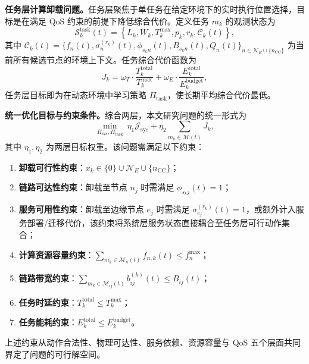 \textbf{任务层计算卸载问题。}任务层聚焦于单任务在给定环境下的实时执行位置选择，目标是在满足 QoS 约束的前提下降低综合代价。定义任务 $m_k$ 的观测状态为
\begin{equation}
  \mathcal{S}^{\mathrm{task}}_k(t)=\left\{L_k,W_k,T_k^{\max},p_k,r_k,\mathcal{C}_k(t)\right\},
\end{equation}
其中 $\mathcal{C}_k(t)=\{f_n(t),\sigma_n^{(r_k)}(t),\phi_{s_kn}(t),B_{s_kn}(t),Q_n(t)\}_{n\in\mathcal{N}_E\cup\{n_{\mathrm{CC}}\}}$ 为当前所有候选节点的环境上下文。任务综合代价函数为
\begin{equation}
  J_k=\omega_T \cdot \frac{T_k^{\mathrm{total}}}{T_k^{\max}}+\omega_E \cdot \frac{E_k^{\mathrm{total}}}{E_k^{\mathrm{budget}}},
\end{equation}
任务层目标即为在动态环境中学习策略 $\Pi_{\mathrm{task}}$，使长期平均综合代价最低。

\textbf{统一优化目标与约束条件。}综合两层，本文研究问题的统一形式为
\begin{equation}
  \min_{\Pi_{\mathrm{sys}},\Pi_{\mathrm{task}}}\ \eta_1 \mathcal{J}_{\mathrm{sys}}+\eta_2 \sum_{m_k\in\mathcal{M}(t)} J_k,
\end{equation}
其中 $\eta_1,\eta_2$ 为两层目标权重。该问题需满足以下约束：
\begin{enumerate}
  \item \textbf{卸载可行性约束}：$x_k \in \{0\}\cup \mathcal{N}_E \cup \{n_{\mathrm{CC}}\}$；
  \item \textbf{链路可达性约束}：卸载至节点 $n_j$ 时需满足 $\phi_{s_kj}(t)=1$；
  \item \textbf{服务可用性约束}：卸载至边缘节点 $e_j$ 时需满足 $\sigma_{e_j}^{(r_k)}(t)=1$，或额外计入服务部署/迁移代价，该约束将系统层服务状态直接耦合至任务层可行动作集合；
  \item \textbf{计算资源容量约束}：$\sum_{m_k\in \mathcal{M}_n(t)} f_{n,k}(t)\leq f_n^{\max}$；
  \item \textbf{链路带宽约束}：$\sum_{m_k\in \mathcal{M}_{ij}(t)} b_{ij}^{(k)}(t)\leq B_{ij}(t)$；
  \item \textbf{任务时延约束}：$T_k^{\mathrm{total}}\leq T_k^{\max}$；
  \item \textbf{任务能耗约束}：$E_k^{\mathrm{total}}\leq E_k^{\mathrm{budget}}$。
\end{enumerate}
上述约束从动作合法性、物理可达性、服务依赖、资源容量与 QoS 五个层面共同界定了问题的可行解空间。

